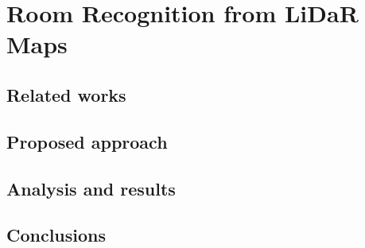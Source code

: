 \chapter{Room Recognition from LiDaR Maps}


\section{Related works}


\section{Proposed approach}


\section{Analysis and results}


\section{Conclusions}